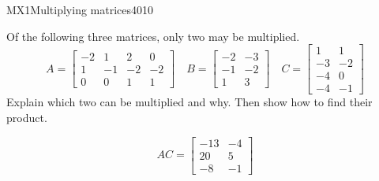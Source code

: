 \begin{exercise}{MX1}{Multiplying matrices}{4010} 
\begin{exerciseStatement} 

Of the following three matrices, only two may be multiplied. \[
          A=\left[\begin{array}{cccc}
-2 & 1 & 2 & 0 \\
1 & -1 & -2 & -2 \\
0 & 0 & 1 & 1
\end{array}\right] \hspace{1em} B=\left[\begin{array}{cc}
-2 & -3 \\
-1 & -2 \\
1 & 3
\end{array}\right] \hspace{1em} C=\left[\begin{array}{cc}
1 & 1 \\
-3 & -2 \\
-4 & 0 \\
-4 & -1
\end{array}\right]
      \] Explain which two can be multiplied and why. Then show how to find their product.

 \end{exerciseStatement}
 \begin{exerciseAnswer} \[AC=\left[\begin{array}{cc}
-13 & -4 \\
20 & 5 \\
-8 & -1
\end{array}\right]\] \end{exerciseAnswer}
 \end{exercise}


